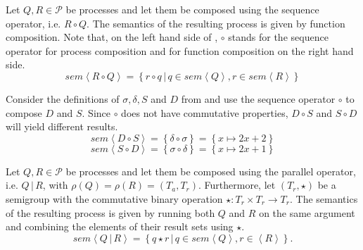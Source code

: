 \begin{definition}
\label{def:sem_sequence}
Let $Q, R \in \mathcal{P}$ be processes and let them be composed using the sequence operator, i.e. $R \circ Q$. The semantics of the resulting process is given by function composition. Note that, on the left hand side of , $\circ$ stands for the sequence operator for process composition and for function composition on the right hand side.
  \begin{equation}
    \label{eqn:sem_sequence}
    sem \left\langle R \circ Q \right\rangle = \left\{ r \circ q \,|\, q \in sem \left\langle Q \right\rangle, r \in sem \left\langle R \right\rangle \right\}
  \end{equation}
  \hfill\qedsymbol
\end{definition}

\begin{example}
\label{exp:sem_sequence}
Consider the definitions of $\sigma, \delta, S$ and $D$ from  and use the sequence operator $\circ$ to compose $D$ and $S$. Since $\circ$ does not have commutative properties, $D \circ S$ and $S \circ D$ will yield different results.
  \begin{equation}
    sem \left\langle D \circ S \right\rangle = \left\{ \delta \circ \sigma \right\} = \left\{ x \mapsto 2x+2 \right\}
  \end{equation}
  \begin{equation}
    sem \left\langle S \circ D \right\rangle = \left\{ \sigma \circ \delta \right\} = \left\{ x \mapsto 2x+1 \right\}
  \end{equation}
  \hfill\qedsymbol
\end{example}


\begin{definition}
\label{def:sem_parallel}
Let $Q, R \in \mathcal{P}$ be processes and let them be composed using the parallel operator, i.e. $Q \,|\, R$, with $\rho \left( Q \right) = \rho \left( R \right) = \left( T_a, T_r \right)$. Furthermore, let $\left( T_r, \star \right)$ be a semigroup with the commutative binary operation $\star \colon T_r \times T_r \to T_r$. The semantics of the resulting process is given by running both $Q$ and $R$ on the same argument and combining the elements of their result sets using $\star$.
  \begin{equation}
    \label{eqn:sem_parallel}
    sem \left\langle Q \,|\, R \right\rangle = \left\{ q \star r \,|\, q \in sem \left\langle Q \right\rangle, r \in \left\langle R \right\rangle \right\}.
  \end{equation}
  \hfill\qedsymbol
\end{definition}

